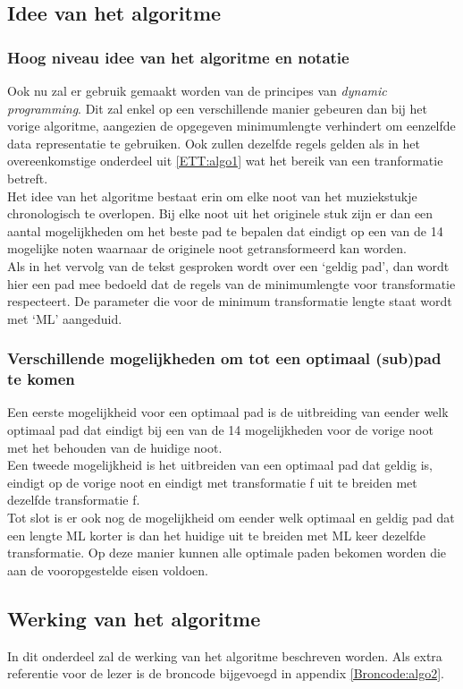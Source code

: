 \subsection{Idee van het algoritme}
\subsubsection{Hoog niveau idee van het algoritme en notatie}
Ook nu zal er gebruik gemaakt worden van de principes van \textit{dynamic programming}. Dit zal enkel op een verschillende manier gebeuren dan bij het vorige algoritme, aangezien de opgegeven minimumlengte verhindert om eenzelfde data representatie te gebruiken. Ook zullen dezelfde regels gelden als in het overeenkomstige onderdeel uit \ref{ETT:algo1} wat het bereik van een tranformatie betreft.\\ 
Het idee van het algoritme bestaat erin om elke noot van het muziekstukje chronologisch te overlopen. Bij elke noot uit het originele stuk zijn er dan een aantal mogelijkheden om het beste pad te bepalen dat eindigt op een van de 14 mogelijke noten waarnaar de originele noot getransformeerd kan worden.\\ 
Als in het vervolg van de tekst gesproken wordt over een `geldig pad', dan wordt hier een pad mee bedoeld dat de regels van de minimumlengte voor transformatie respecteert. De parameter die voor de minimum transformatie lengte staat wordt met `ML' aangeduid.

\subsubsection{Verschillende mogelijkheden om tot een optimaal (sub)pad te komen} 
Een eerste mogelijkheid voor een optimaal pad is de uitbreiding van eender welk optimaal pad dat eindigt bij een van de 14 mogelijkheden voor de vorige noot met het behouden van de huidige noot.\\ 
Een tweede mogelijkheid is het uitbreiden van een optimaal pad dat geldig is, eindigt op de vorige noot en eindigt met transformatie f uit te breiden met dezelfde transformatie f.\\ 
Tot slot is er ook nog de mogelijkheid om eender welk optimaal en geldig pad dat een lengte ML korter is dan het huidige uit te breiden met ML keer dezelfde transformatie. Op deze manier kunnen alle optimale paden bekomen worden die aan de vooropgestelde eisen voldoen.

\subsection{Werking van het algoritme}
In dit onderdeel zal de werking van het algoritme beschreven worden. Als extra referentie voor de lezer is de broncode bijgevoegd in appendix \ref{Broncode:algo2}.\\

